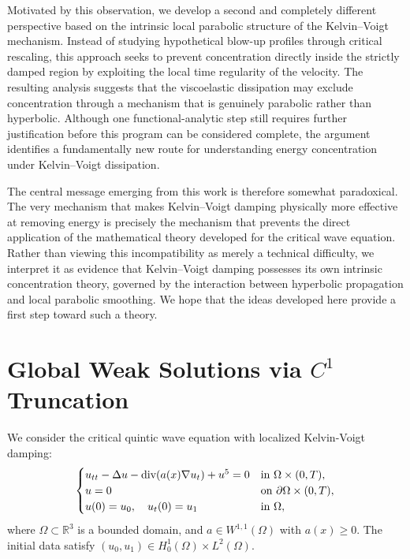 \documentclass[11pt,letterpaper]{amsart}
\begin{document}
Motivated by this observation, we develop a second and completely different perspective based on the intrinsic local parabolic structure of the Kelvin--Voigt mechanism. Instead of studying hypothetical blow-up profiles through critical rescaling, this approach seeks to prevent concentration directly inside the strictly damped region by exploiting the local time regularity of the velocity. The resulting analysis suggests that the viscoelastic dissipation may exclude concentration through a mechanism that is genuinely parabolic rather than hyperbolic. Although one functional-analytic step still requires further justification before this program can be considered complete, the argument identifies a fundamentally new route for understanding energy concentration under Kelvin--Voigt dissipation.

The central message emerging from this work is therefore somewhat paradoxical. The very mechanism that makes Kelvin--Voigt damping physically more effective at removing energy is precisely the mechanism that prevents the direct application of the mathematical theory developed for the critical wave equation. Rather than viewing this incompatibility as merely a technical difficulty, we interpret it as evidence that Kelvin--Voigt damping possesses its own intrinsic concentration theory, governed by the interaction between hyperbolic propagation and local parabolic smoothing. We hope that the ideas developed here provide a first step toward such a theory.

\section{Global Weak Solutions via $C^1$ Truncation}

We consider the critical quintic wave equation with localized Kelvin-Voigt damping:
\begin{equation}\label{eq:main}
\begin{cases}
u_{tt} - \Delta u - \hbox{div}(a(x) \nabla u_t) + u^5 = 0 & \text{in } \Omega \times (0,T), \\
u = 0 & \text{on } \partial \Omega \times (0,T), \\
u(0) = u_0, \quad u_t(0) = u_1 & \text{in } \Omega,
\end{cases}
\end{equation}
where $\Omega \subset \mathbb{R}^3$ is a bounded domain, and $a \in W^{1,1}(\Omega)$ with $a(x) \ge 0$. The initial data satisfy $(u_0, u_1) \in H_0^1(\Omega) \times L^2(\Omega)$.
\end{document}
